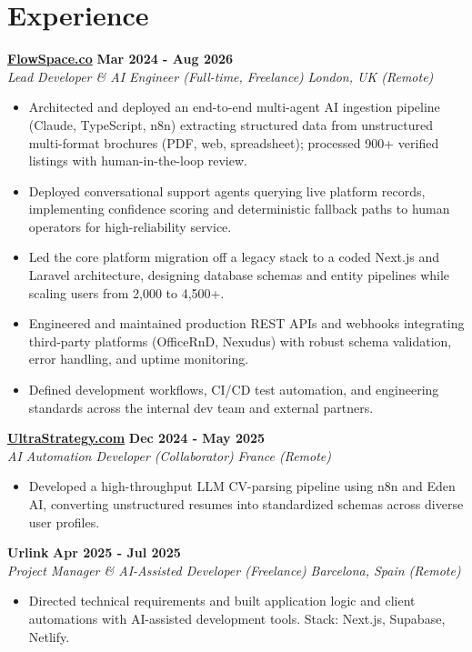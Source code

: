 \documentclass[a4paper,10pt]{article}
\newcommand{\role}[4]{%
 \textbf{#1} \hfill \textbf{#2}\\[1pt]%
 \textit{#3} \hfill \textit{#4}\\[2pt]%
}
\begin{document}
\section{Experience}

\role{\href{https://flowspace.co}{FlowSpace.co}}{Mar 2024 - Aug 2026}{Lead Developer \& AI Engineer (Full-time, Freelance)}{London, UK (Remote)}
\begin{itemize}
 \item Architected and deployed an end-to-end multi-agent AI ingestion pipeline (Claude, TypeScript, n8n) extracting structured data from unstructured multi-format brochures (PDF, web, spreadsheet); processed 900+ verified listings with human-in-the-loop review.
 \item Deployed conversational support agents querying live platform records, implementing confidence scoring and deterministic fallback paths to human operators for high-reliability service.
 \item Led the core platform migration off a legacy stack to a coded Next.js and Laravel architecture, designing database schemas and entity pipelines while scaling users from 2,000 to 4,500+.
 \item Engineered and maintained production REST APIs and webhooks integrating third-party platforms (OfficeRnD, Nexudus) with robust schema validation, error handling, and uptime monitoring.
 \item Defined development workflows, CI/CD test automation, and engineering standards across the internal dev team and external partners.
\end{itemize}

\role{\href{https://ultrastrategy.com}{UltraStrategy.com}}{Dec 2024 - May 2025}{AI Automation Developer (Collaborator)}{France (Remote)}
\begin{itemize}
 \item Developed a high-throughput LLM CV-parsing pipeline using n8n and Eden AI, converting unstructured resumes into standardized schemas across diverse user profiles.
\end{itemize}

\role{Urlink}{Apr 2025 - Jul 2025}{Project Manager \& AI-Assisted Developer (Freelance)}{Barcelona, Spain (Remote)}
\begin{itemize}
 \item Directed technical requirements and built application logic and client automations with AI-assisted development tools. Stack: Next.js, Supabase, Netlify.
\end{itemize}
\end{document}
